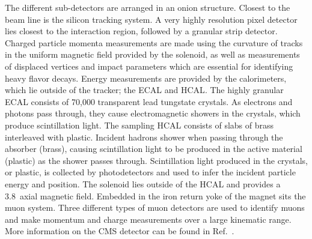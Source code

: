 %
The different sub-detectors are arranged in an onion structure.
%
Closest to the beam line is the silicon tracking system.
A very highly resolution pixel detector lies closest to the interaction region, followed by a granular strip detector.
Charged particle momenta measurements are made using the curvature of tracks in the uniform magnetic field provided by the solenoid, as well as measurements of displaced vertices and impact parameters which are essential for identifying heavy flavor decays. 
%
Energy measurements are provided by the calorimeters, which lie outside of the tracker; the \ac{ECAL} and \ac{HCAL}. 
The highly granular \ac{ECAL} consists of 70,000 transparent lead tungstate crystals. 
As electrons and photons pass through, they cause electromagnetic showers in the crystals, which produce scintillation light.
%
The sampling \ac{HCAL} consists of slabs of brass interleaved with plastic. 
Incident hadrons shower when passing through the absorber (brass), causing scintillation light to be produced in the active material (plastic) as the shower passes through.
%
Scintillation light produced in the crystals, or plastic, is collected by photodetectors and used to infer the incident particle energy and position.
%
The solenoid lies outside of the \ac{HCAL} and provides a 3.8~\T axial magnetic field.
%
Embedded in the iron return yoke of the magnet sits the muon system. 
Three different types of muon detectors are used to identify muons and make momentum and charge measurements over a large kinematic range.
%
More information on the CMS detector can be found in Ref.~\cite{Chatrchyan:2008aa}.

%

